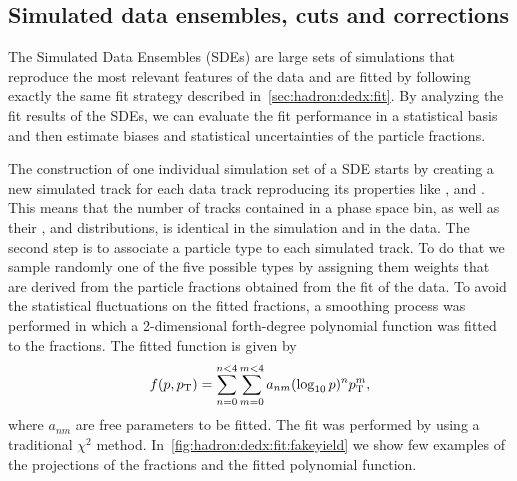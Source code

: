 \subsection{Simulated data ensembles, cuts and corrections}
\label{sec:hadron:dedx:sde}

The Simulated Data Ensembles (SDEs) are large sets of
simulations that reproduce the most relevant
features of the data and are fitted by following
exactly the same fit strategy described in~\cref{sec:hadron:dedx:fit}.
By analyzing the fit results of the SDEs, we can evaluate the fit
performance in a statistical basis and then estimate biases
and statistical uncertainties of the particle fractions. 

The construction of one individual simulation set of a SDE starts
by creating a new simulated track for each data track reproducing
its properties like \pp, \pT and \ncl. This means that the number of
tracks contained in a phase space bin, as well as their \pp, \pT and
\ncl distributions, is identical in the simulation and in the data.
The second step is to associate a particle type to each simulated track.
To do that we sample randomly one of the five possible types
by assigning them weights that are derived from the particle fractions
obtained from the \dedx fit of the data.
To avoid the statistical fluctuations on the fitted fractions,
a smoothing process was performed in which a 2-dimensional
forth-degree polynomial function was fitted to the fractions.
The fitted function is given by
\begin{equation}
  f(p,p_\text{T}) = \sum_{n=0}^{n<4} \sum_{m=0}^{m<4} a_{nm} (\log_{10} p)^n p_\text{T}^m,
  \label{eq:hadron:dedx:pol}
\end{equation}
where $a_{nm}$ are free parameters to be fitted.
The fit was performed by using a traditional $\chi^2$ method.
In~\cref{fig:hadron:dedx:fit:fakeyield} we show few examples
of the \pT projections of the fractions and the fitted
polynomial function. 


